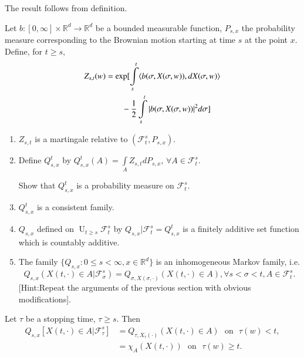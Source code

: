 The result follows from definition.

Let $b:[0,\infty]\times\mathbb{R}^{d}\to \mathbb{R}^{d}$ be a bounded
measurable function, $P_{s,x}$ the probability measure corresponding
to the Brownian motion starting at time $s$ at the point $x$. Define,
for $t\geq s$,
\begin{align*}
Z_{s,t}(w) &= \exp[\int\limits^{t}_{s}\langle
  b(\sigma,X(\sigma,w)),dX(\sigma,w)\rangle\\
&\qquad -\frac{1}{2}\int\limits^{t}_{s}|b(\sigma,X(\sigma,w))|^{2}d\sigma]
\end{align*}

\begin{exer*}
\begin{enumerate}
\renewcommand{\theenumi}{\roman{enumi}}
\renewcommand{\labelenumi}{(\theenumi)}
\item $Z_{s,t}$ is a martingale relative to $(\mathscr{F}^{s}_{t},
  P_{s,x})$. 

\item Define $Q^{t}_{s,x}$ by
  $Q^{t}_{s,x}(A)=\int\limits_{A}Z_{s,t}dP_{s,x}$, $\forall A\in
  \mathscr{F}^{s}_{t}$. 

Show that $Q^{t}_{s,x}$ is a probability measure on
$\mathscr{F}^{s}_{t}$.

\item $Q^{t}_{s,x}$ is a consistent family.

\item $Q_{s,x}$ defined on ${\displaystyle{\mathop{U}_{t\geq
      s}}}\mathscr{F}^{s}_{t}$ by
  $Q_{s,x}|\mathscr{F}^{s}_{t}=Q^{t}_{s,x}$ is a finitely additive set
  function which is countably additive.

\item The family $\{Q_{s,x}:0\leq s<\infty, x\in \mathbb{R}^{d}\}$ is
  an inhomogeneous Markov family, i.e.
$$
Q_{s,x}(X(t,\cdot)\in
A|\mathscr{F}^{s}_{\sigma})=Q_{\sigma,X(\sigma,\cdot)}(X(t,\cdot)\in
A), \forall s<\sigma<t,A\in \mathscr{F}^{s}_{t}.
$$
[Hint:\pageoriginale Repeat the arguments of the previous section with obvious
  modifications]. 
\end{enumerate}
\end{exer*}

\begin{prop*}
Let $\tau$ be a stopping time, $\tau\geq s$. Then
\begin{align*}
Q_{s,x}[X(t,\cdot)\in A|\mathscr{F}^{s}_{\tau}] &=
Q_{\tau,X_{\tau}(\cdot)}(X(t,\cdot)\in A)\text{~ on~ }\tau(w)<t,\\
&= \chi_{A}(X(t,\cdot))\text{~ on~ } \tau(w)\geq t.
\end{align*}
\end{prop*}

